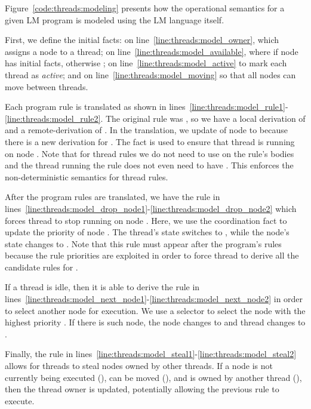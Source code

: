 Figure~\ref{code:threads:modeling} presents how the operational semantics for a
given LM program is modeled using the LM language itself.

First, we define the initial facts:  on
line~\ref{line:threads:model_owner}, which assigns a node to a thread;
 on line~\ref{line:threads:model_available}, where
 if node  has initial facts, otherwise ;
 on line~\ref{line:threads:model_active} to mark each thread as
\emph{active}; and  on line~\ref{line:threads:model_moving} so
that all nodes can move between threads.

Each program rule is translated as shown in
lines~\ref{line:threads:model_rule1}-\ref{line:threads:model_rule2}. The
original rule was , so we have a local derivation of  and a
remote-derivation of . In the translation, we update
 of node  to  because there is a new
derivation for . The fact  is used to ensure that
thread  is running on node . Note that for thread rules we do
not need to use  on the rule's bodies and the thread running
the rule does not even need to have . This enforces the
non-deterministic semantics for thread rules.

After the program rules are translated, we have the rule in
lines~\ref{line:threads:model_drop_node1}-\ref{line:threads:model_drop_node2}
which forces thread  to stop running on node . Here, we use the
coordination fact  to update the priority of node
. The thread's state switches to , while the node's state
changes to . Note that this rule must appear after the
program's rules because the rule priorities are exploited in order to force
thread  to derive all the candidate rules for .

If a thread is idle, then it is able to derive the rule in
lines~\ref{line:threads:model_next_node1}-\ref{line:threads:model_next_node2} in
order to select another node for execution. We use a  selector to
select the node  with the highest priority . If there is such
node, the node changes to  and thread  changes to
.

Finally, the rule in
lines~\ref{line:threads:model_steal1}-\ref{line:threads:model_steal2} allows for
threads to steal nodes owned by other threads. If a node is not currently being
executed (), can be moved (), and is owned by
another thread  (), then the thread owner is
updated, potentially allowing the previous rule to execute.

